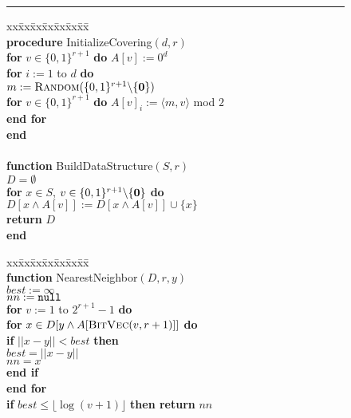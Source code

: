 \documentclass[prodmode,acmtalg]{acmsmall}
\begin{document}
\begin{figure}[t]
	\hrule
\begin{minipage}{.5\linewidth}
	\begin{tabbing}
	  xx\=xx\=xx\=xx\=xx\=xx\=xx\=\kill\\
	  {\bf procedure} {\sc InitializeCovering}$(d,r)$\+\\
	    {\bf for} $v\in \{0,1\}^{r+1}$ {\bf do} $A[v] := 0^{d}$\\
	    {\bf for} $i:=1$ to $d$ {\bf do} \+\\
			$ m := \text{\sc Random}(\{0,1\}^{r+1}\backslash \{{\bf 0}\})$\\
	    	{\bf for} $v\in \{0,1\}^{r+1}$ {\bf do}
				$A[v]_i := \langle m, v\rangle$ mod $2$\-\\
	  {\bf end for}\-\\
	  {\bf end}\\
	  \\
	  {\bf function} {\sc BuildDataStructure}$(S,r)$\+\\
	  	$D = \emptyset$\\
{\bf for} $x\in S$, $v\in \{0,1\}^{r+1}\backslash \{{\bf 0}\}$ {\bf do}\+\\
		      $D[x \wedge A[v]] := D[x \wedge A[v]] \cup \{x\}$\-\\
		{\bf return} $D$\-\\
	  {\bf end}\\
	\end{tabbing}
	\end{minipage}
	\begin{minipage}{.5\linewidth}
	\begin{tabbing}
	  xx\=xx\=xx\=xx\=xx\=xx\=xx\=\kill
	  \+\+\\
	  {\bf function} {\sc NearestNeighbor}$(D,r,y)$\+\\
	  	$best := \infty$\\ 
	  	$nn := {\tt null}$\\ 
	    {\bf for} $v:=1$ to $2^{r+1}-1$ {\bf do} \+\\
			{\bf for} $x \in D[y \wedge A[\text{\sc BitVec}(v,r+1)]]$ {\bf do}\+\\
		  		{\bf if} $||x-y|| < best$ {\bf then}\+\\
					$best = ||x-y||$\\
					$nn = x$\-\\
				{\bf end if}\-\\
			{\bf end for}\\
			{\bf if} $best \leq \lfloor \log(v+1)\rfloor$ {\bf then return} $nn$\-\\

\end{tabbing}
\end{minipage}
\end{figure}
\end{document}
